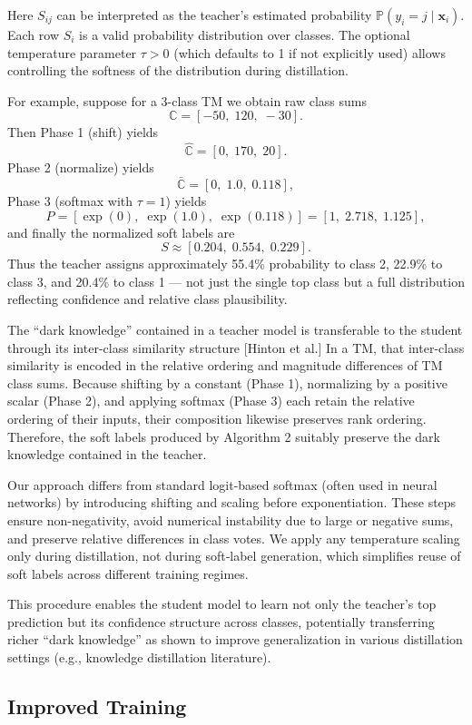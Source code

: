 \documentclass[sn-mathphys-num]{sn-jnl}%
\theoremstyle{thmstyleone}%
\theoremstyle{thmstyletwo}%
\theoremstyle{thmstylethree}%
\begin{document}
Here $S_{ij}$ can be interpreted as the teacher’s estimated probability $\mathbb{P}(y_i = j \mid \mathbf{x}_i)$. Each row $S_i$ is a valid probability distribution over classes. The optional temperature parameter $\tau > 0$ (which defaults to 1 if not explicitly used) allows controlling the softness of the distribution during distillation.

For example, suppose for a 3-class TM we obtain raw class sums  
\[
\mathbb{C} = [-50,\;120,\;-30].
\]  
Then Phase 1 (shift) yields  
\[
\hat{\mathbb{C}} = [0,\;170,\;20].
\]  
Phase 2 (normalize) yields  
\[
\bar{\mathbb{C}} = [0,\;1.0,\;0.118],
\]  
Phase 3 (softmax with $\tau = 1$) yields  
\[
P = [\exp(0),\;\exp(1.0),\;\exp(0.118)] = [1,\;2.718,\;1.125],
\]  
and finally the normalized soft labels are  
\[
S \approx [0.204,\;0.554,\;0.229].
\]  
Thus the teacher assigns approximately 55.4\% probability to class 2, 22.9\% to class 3, and 20.4\% to class 1 — not just the single top class but a full distribution reflecting confidence and relative class plausibility.

The ``dark knowledge'' contained in a teacher model is transferable to the student through its inter-class similarity structure [Hinton et al.] In a TM, that inter-class similarity is encoded in the relative ordering and magnitude differences of TM class sums. Because shifting by a constant (Phase 1), normalizing by a positive scalar (Phase 2), and applying softmax (Phase 3) each retain the relative ordering of their inputs, their composition likewise preserves rank ordering. Therefore, the soft labels produced by Algorithm 2 suitably preserve the dark knowledge contained in the teacher.

Our approach differs from standard logit-based softmax (often used in neural networks) by introducing shifting and scaling before exponentiation. These steps ensure non-negativity, avoid numerical instability due to large or negative sums, and preserve relative differences in class votes. We apply any temperature scaling only during distillation, not during soft‑label generation, which simplifies reuse of soft labels across different training regimes.

This procedure enables the student model to learn not only the teacher’s top prediction but its confidence structure across classes, potentially transferring richer “dark knowledge” as shown to improve generalization in various distillation settings (e.g., knowledge distillation literature).  

\subsection{Improved Training} 
\end{document}
